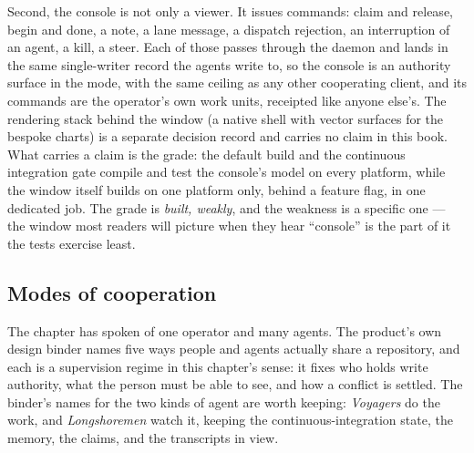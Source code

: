 \documentclass[11pt,a4paper]{article}
\theoremstyle{definition}
\theoremstyle{plain}
\begin{document}
Second, the console is not only a viewer. It issues commands: claim and
release, begin and done, a note, a lane message, a dispatch rejection, an
interruption of an agent, a kill, a steer. Each of those passes through the
daemon and lands in the same single-writer record the agents write to, so the
console is an authority surface in the  mode, with
the same ceiling as any other cooperating client, and its commands are the
operator's own work units, receipted like anyone else's. The rendering stack
behind the window (a native shell with vector surfaces for the bespoke
charts) is a separate decision record and carries no claim in this book. What
carries a claim is the grade: the default build and the continuous
integration gate compile and test the console's model on every platform,
while the window itself builds on one platform only, behind a feature flag,
in one dedicated job. The grade is \emph{built, weakly}, and the weakness is
a specific one --- the window most readers will picture when they hear
``console'' is the part of it the tests exercise least.

\subsection{Modes of cooperation}\label{sec:cooperation-modes}

The chapter has spoken of one operator and many agents. The product's own
design binder names five ways people and agents actually share a repository,
and each is a supervision regime in this chapter's sense: it fixes who holds
write authority, what the person must be able to see, and how a conflict is
settled. The binder's names for the two kinds of agent are worth keeping:
\emph{Voyagers} do the work, and \emph{Longshoremen} watch it, keeping the
continuous-integration state, the memory, the claims, and the transcripts in
view.
\end{document}
